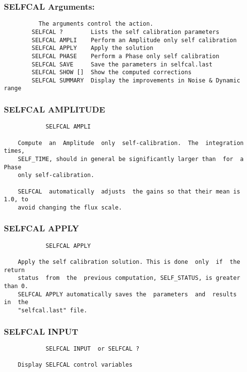 \subsubsection{SELFCAL Arguments:}
\begin{verbatim}
          The arguments control the action.
        SELFCAL ?        Lists the self calibration parameters
        SELFCAL AMPLI    Perform an Amplitude only self calibration
        SELFCAL APPLY    Apply the solution
        SELFCAL PHASE    Perform a Phase only self calibration
        SELFCAL SAVE     Save the parameters in selfcal.last
        SELFCAL SHOW []  Show the computed corrections
        SELFCAL SUMMARY  Display the improvements in Noise & Dynamic range
\end{verbatim}
\subsubsection{SELFCAL AMPLITUDE}
\begin{verbatim}
            SELFCAL AMPLI

    Compute  an  Amplitude  only  self-calibration.  The  integration times,
    SELF_TIME, should in general be significantly larger than  for  a  Phase
    only self-calibration.

    SELFCAL  automatically  adjusts  the gains so that their mean is 1.0, to
    avoid changing the flux scale.

\end{verbatim}
\subsubsection{SELFCAL APPLY}
\begin{verbatim}
            SELFCAL APPLY

    Apply the self calibration solution. This is done  only  if  the  return
    status  from  the  previous computation, SELF_STATUS, is greater than 0.
    SELFCAL APPLY automatically saves the  parameters  and  results  in  the
    "selfcal.last" file.

\end{verbatim}
\subsubsection{SELFCAL INPUT}
\begin{verbatim}
            SELFCAL INPUT  or SELFCAL ?

    Display SELFCAL control variables

\end{verbatim}
